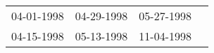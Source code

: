 \begin{supertabular}{llll}
 04-01-1998 &  04-29-1998 &  05-27-1998 \\
 04-15-1998 &  05-13-1998 &  11-04-1998 \\
\end{supertabular}
